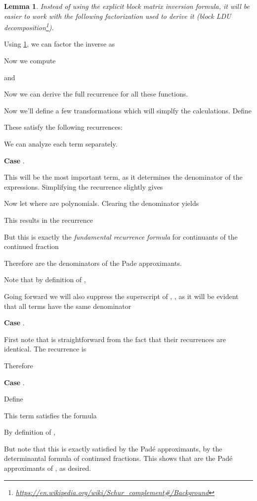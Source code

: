 \documentclass{article}
\newtheorem{lemma}{Lemma}[section]
\begin{document}
\begin{lemma}\label{lmm:block-ldu}
Instead of using the explicit block matrix inversion formula, it will be easier to work with the following factorization used to derive it (block LDU decomposition\footnote{\url{https://en.wikipedia.org/wiki/Schur_complement\#/Background}}).

\end{lemma}

Using \cref{lmm:block-ldu}, we can factor the inverse as


Now we compute

and



Now we can derive the full recurrence for all these functions.


Now we'll define a few transformations which will simplfy the calculations.
Define


These satisfy the following recurrences:


We can analyze each term separately.

\textbf{Case} .

This will be the most important term, as it determines the denominator of the expressions.
Simplifying the recurrence slightly gives

Now let  where  are polynomials.
Clearing the denominator  yields


This results in the recurrence


But this is exactly the \emph{fundamental recurrence formula} for continuants of the continued fraction

Therefore  are the denominators of the Pade approximants.

Note that by definition of ,


Going forward we will also suppress the superscript of , , as it will be evident that all terms have the same denominator 


\textbf{Case} .

First note that  is straightforward from the fact that their recurrences are identical.
The recurrence is

Therefore


\textbf{Case} .

Define


This term satisfies the formula

By definition of ,


But note that this is exactly satisfied by the Pad\'e approximants, by the determinantal formula of continued fractions.
This shows that  are the Pad\'e approximants of , as desired.
\end{document}
